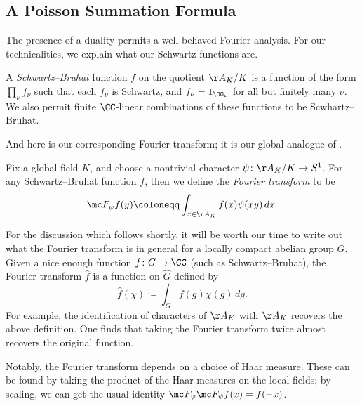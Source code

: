 \documentclass{article}
\begin{document}
\subsection{A Poisson Summation Formula}
The presence of a duality permits a well-behaved Fourier analysis. For our technicalities, we explain what our Schwartz functions are.
\begin{definition}[Schwartz]
	A \textit{Schwartz--Bruhat} function $f$ on the quotient $\AA_K/K$ is a function of the form $\prod_\nu f_\nu$ such that each $f_\nu$ is Schwartz, and $f_\nu=1_{\OO_\nu}$ for all but finitely many $\nu$. We also permit finite $\CC$-linear combinations of these functions to be Scwhartz--Bruhat.
\end{definition}
And here is our corresponding Fourier transform; it is our global analogue of .
\begin{definition}
	Fix a global field $K$, and choose a nontrivial character $\psi\colon\AA_K/K\to S^1$. For any Schwartz--Bruhat function $f$, then we define the \textit{Fourier transform} to be
	\[\mc F_\psi f(y)\coloneqq\int_{x\in\AA_K}f(x)\psi(xy)\,dx.\]
\end{definition}
\begin{remark} \label{rem:general-fourier-trans}
	For the discussion which follows shortly, it will be worth our time to write out what the Fourier transform is in general for a locally compact abelian group $G$. Given a nice enough function $f\colon G\to\CC$ (such as Schwartz--Bruhat), the Fourier transform $\widehat f$ is a function on $\widehat G$ defined by
	\[\widehat f(\chi)\coloneqq\int_Gf(g)\chi(g)\,dg.\]
	For example, the identification of characters of $\AA_K$ with $\AA_K$ recovers the above definition. One finds that taking the Fourier transform twice almost recovers the original function.
\end{remark}
Notably, the Fourier transform depends on a choice of Haar measure. These can be found by taking the product of the Haar measures on the local fields; by scaling, we can get the usual identity $\mc F_\psi\mc F_\psi f(x)=f(-x)$.
\end{document}
